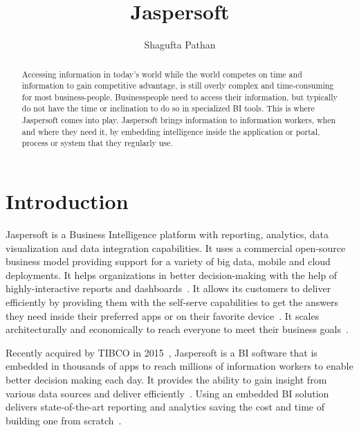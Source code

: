 
\title{Jaspersoft}


\author{Shagufta Pathan}

\renewcommand{\shortauthors}{G. v. Laszewski}


\begin{abstract}
Accessing information in today's world while the world competes on time and
information to gain competitive advantage, is still overly complex and
time-consuming for most business-people. Businesspeople need to access their
information, but typically do not have the time or inclination to do so in
specialized BI tools. This is where Jaspersoft comes into play. Jaspersoft
brings information to information workers, when and where they need it, by
embedding intelligence inside the application or portal, process or system that
they regularly use.  
\end{abstract}


\maketitle

\section{Introduction}
Jaspersoft is a Business Intelligence platform with reporting, analytics, data
visualization and data integration capabilities. It uses a commercial
open-source business model providing support for a variety of big data, mobile
and cloud deployments. It helps organizations in better decision-making with the
help of highly-interactive reports and
dashboards~\cite{hid-sp18-516-www-finances-online}. It allows its customers to
deliver efficiently by providing them with the self-serve capabilities to get
the answers they need inside their preferred apps or on their favorite
device~\cite{hid-sp18-516-www-jaspersoft-overview}. It scales architecturally
and economically to reach everyone to meet their business
goals~\cite{hid-sp18-516-www-finances-online}. 

Recently acquired by TIBCO in 2015~\cite{hid-sp18-516-www-wiki-jasperreports},
Jaspersoft is a BI software that is embedded in thousands of apps to reach
millions of information workers to enable better decision making each day. It
provides the ability to gain insight from various data sources and deliver
efficiently~\cite{hid-sp18-516-www-jaspersoft-overview}. Using an embedded BI
solution delivers state-of-the-art reporting and analytics saving the cost and
time of building one from scratch~\cite{hid-sp18-516-www-embedded-bi}. 



